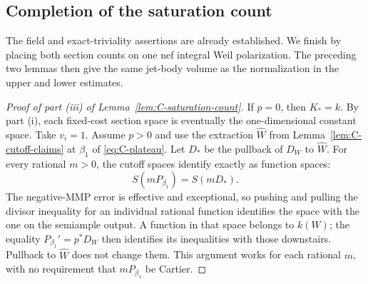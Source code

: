 \subsection{Completion of the saturation count}

The field and exact-triviality assertions are already established.
We finish by placing both section counts on one nef integral Weil
polarization.  The preceding two lemmas then give the same jet-body
volume as the normalization in the upper and lower estimates.
\label{subsec:C-count-completion}

\begin{proof}[Proof of part \textup{(iii)} of Lemma~\ref{lem:C-saturation-count}]
If $p=0$, then $K_*=k$.  By part (i), each fixed-cost section space
is eventually the one-dimensional constant space.  Take $v_i=1$.
Assume $p>0$ and use the extraction $\widehat W$ from
Lemma~\ref{lem:C-cutoff-claims} at $\beta_1$ of
\eqref{eq:C-plateau}.  Let $D_*$ be the pullback of $D_W$ to
$\widehat W$.  For every rational $m>0$, the cutoff spaces identify
exactly as function spaces:
\begin{equation}\label{eq:C-cutoff-base-spaces}
                       S(mP_{\beta_1})=S(mD_*).
\end{equation}
The negative-MMP error is effective and exceptional, so pushing and
pulling the divisor inequality for an individual rational function
identifies the space with the one on the semiample output.  A function
in that space belongs to $k(W)$; the equality $P_{\beta_1}'=p^*D_W$
then identifies its inequalities with those downstairs.  Pullback to
$\widehat W$ does not change them.  This argument works for each
rational $m$, with no requirement that $mP_{\beta_1}$ be Cartier.


\end{proof}
